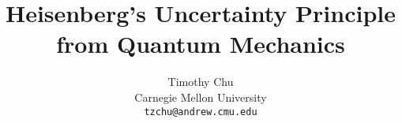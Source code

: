 


\title{Heisenberg's Uncertainty Principle from Quantum Mechanics}
\author{
  Timothy Chu \\
  Carnegie Mellon University\\
  \texttt{tzchu@andrew.cmu.edu}
}

\setcounter{page}{0}
\maketitle
\thispagestyle{empty}
\begin{abstract}

\end{abstract}

\clearpage


\begin{appendix}
\end{appendix}

